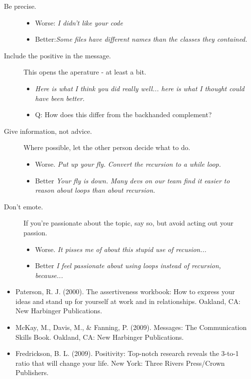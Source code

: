 \documentclass{article}
\begin{document}
\begin{tiny}
\begin{multicols}{3}
\begin{tcolorbox}
\begin{description}
            \item[Be precise.] 
                \begin{itemize}
                   \item Worse: \emph{I didn't like your code} 
                   \item Better:\emph{Some files have different names than the classes they contained.} 
                \end{itemize}
            \item[Include the positive in the message.] This opens the aperature - at least a bit.
                \begin{itemize}
                    \item \emph{Here is what I think you did really well... here is what I thought could have been better.}
                    \item Q: How does this differ from the backhanded complement?
                \end{itemize}
            \item[Give information, not advice.] Where possible, let the other person decide what to do.
                \begin{itemize}
                    \item Worse. \emph{Put up your fly.} \emph{Convert the recursion to a while loop.}
                    \item Better \emph{Your fly is down.} \emph{Many devs on our team find it easier to reason about loops than about recursion.}
                \end{itemize}
            \item[Don't emote.] If you're passionate about the topic, say so, but avoid acting out your passion.
                \begin{itemize}
                    \item Worse. \emph{It pisses me of about this stupid use of recusion...}
                    \item Better \emph{I feel passionate about using loops instead of recursion, because...}
                \end{itemize}
        \end{description}

    \end{tcolorbox}

\end{multicols}

\begin{itemize}
    \item Paterson, R. J. (2000). The assertiveness workbook: How to express your ideas and stand up for yourself at work and in relationships. Oakland, CA: New Harbinger Publications.
    \item McKay, M., Davis, M., \& Fanning, P. (2009). Messages: The Communication Skills Book. Oakland, CA: New Harbinger Publications.
    \item Fredrickson, B. L. (2009). Positivity: Top-notch research reveals the 3-to-1 ratio that will change your life. New York: Three Rivers Press/Crown Publishers.
\end{itemize}

\end{tiny}
\end{document}
